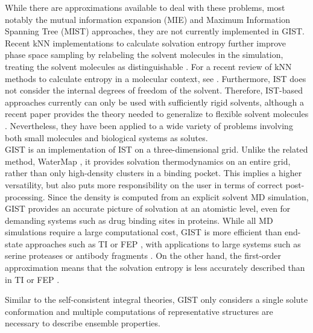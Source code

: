 \documentclass[9pt,tutorial,pubversion]{livecoms}
\begin{document}
While there are approximations available to deal with these problems, most notably the mutual information expansion (MIE) and Maximum Information Spanning Tree (MIST) approaches, they are not currently implemented in GIST. 
Recent kNN implementations to calculate solvation entropy further improve phase space sampling by relabeling the solvent molecules in the simulation, treating the solvent molecules as distinguishable \cite{reinhard2007estimation,heinz2019computing,heinz2021permut,fogolari2021optimal}. 
For a recent review of kNN methods to calculate entropy in a molecular context, see \cite{fogolari2024k}.
Furthermore, IST does not consider the internal degrees of freedom of the solvent.
Therefore, IST-based approaches currently can only be used with sufficiently rigid solvents, although a recent paper provides the theory needed to generalize to flexible solvent molecules \cite{gilson2024freeenergy}.
Nevertheless, they have been applied to a wide variety of problems involving both small molecules and biological systems as solutes.\\
GIST is an implementation of IST on a three-dimensional grid. 
Unlike the related method, WaterMap \cite{Abel2008-watermap,Young2007-watermap}, it provides solvation thermodynamics on an entire grid, rather than only high-density clusters in a binding pocket.
This implies a higher versatility, but also puts more responsibility on the user in terms of correct post-processing.
Since the density is computed from an explicit solvent MD simulation, GIST provides an accurate picture of solvation at an atomistic level, even for demanding systems such as drug binding sites in proteins.
While all MD simulations require a large computational cost, GIST is more efficient than end-state approaches such as TI \cite{Kirkwood1935-ti} or FEP \cite{Zwanzig1954-reweighting}, with applications to large systems such as serine proteases \cite{Kraml2019-gigist} or antibody fragments \cite{Waibl2021-gist-antibodies}.
On the other hand, the first-order approximation means that the solvation entropy is less accurately described than in TI or FEP \cite{Chen2021,Waibl2021-gist-salt}. 

Similar to the self-consistent integral theories, GIST only considers a single solute conformation and multiple computations of representative structures are necessary to describe ensemble properties. 
\end{document}

